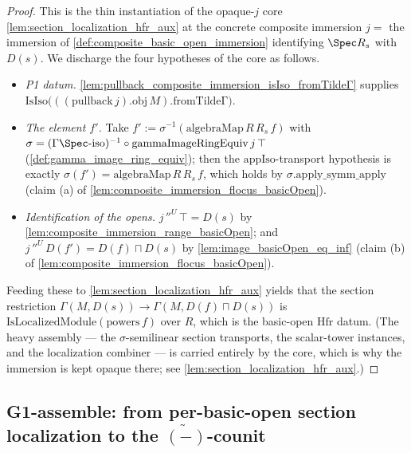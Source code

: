 \begin{proof}
  This is the thin instantiation of the opaque-\(j\) core
  \cref{lem:section_localization_hfr_aux} at the concrete composite immersion
  \(j = \) the immersion of \cref{def:composite_basic_open_immersion} identifying \(\Spec R_s\) with
  \(D(s)\). We discharge the four hypotheses of the core as follows.
  \begin{itemize}
    \item \emph{P1 datum.} \cref{lem:pullback_composite_immersion_isIso_fromTildeΓ} supplies
      \(\mathrm{IsIso}\bigl(((\mathrm{pullback}\,j).\mathrm{obj}\,M).\mathrm{fromTildeΓ}\bigr)\).
    \item \emph{The element \(f'\).} Take
      \(f' := \sigma^{-1}(\mathrm{algebraMap}\,R\,R_s\,f)\) with
      \(\sigma = (\Gamma\Spec\text{-iso})^{-1} \circ \mathrm{gammaImageRingEquiv}\,j\,\top\)
      (\cref{def:gamma_image_ring_equiv}); then the \(\mathrm{appIso}\)-transport hypothesis is exactly
      \(\sigma(f') = \mathrm{algebraMap}\,R\,R_s\,f\), which holds by \(\sigma.\mathrm{apply\_symm\_apply}\)
      (claim (a) of \cref{lem:composite_immersion_flocus_basicOpen}).
    \item \emph{Identification of the opens.} \(j\,''^{U}\,\top = D(s)\) by
      \cref{lem:composite_immersion_range_basicOpen}; and
      \(j\,''^{U}\,D(f') = D(f) \sqcap D(s)\) by \cref{lem:image_basicOpen_eq_inf} (claim (b) of
      \cref{lem:composite_immersion_flocus_basicOpen}).
  \end{itemize}
  Feeding these to \cref{lem:section_localization_hfr_aux} yields that the section restriction
  \(\Gamma(M, D(s)) \to \Gamma(M, D(f) \sqcap D(s))\) is
  \(\mathrm{IsLocalizedModule}(\mathrm{powers}\,f)\) over \(R\), which is the basic-open
  \(\mathrm{Hfr}\) datum. (The heavy assembly --- the \(\sigma\)-semilinear section transports, the
  scalar-tower instances, and the localization combiner --- is carried entirely by the core, which is
  why the immersion is kept opaque there; see \cref{lem:section_localization_hfr_aux}.)
\end{proof}

\subsection{G1-assemble: from per-basic-open section localization to the
\texorpdfstring{$\widetilde{(-)}$}{tilde}-counit}

